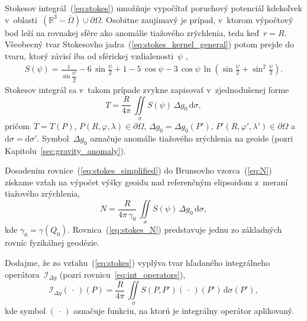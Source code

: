 \documentclass[a4paper, 12pt]{book}
\newcommand{\diff}{\mathrm d}
\begin{document}
Stokesov integrál~(\ref{eq:stokes}) umožňuje vypočítať poruchový potenciál 
kdekoľvek v~oblasti~$\left( \mathbb{R}^3 - \overline\Omega\right) \cup 
\partial\Omega$.  Osobitne zaujímavý je prípad, v~ktorom výpočtový bod leží na 
rovnakej sfére ako anomálie tiažového zrýchlenia, teda keď~$r = R$.  Všeobecný 
tvar Stokesovho jadra~(\ref{eq:stokes_kernel_general}) potom prejde do tvaru, 
ktorý závisí iba od sférickej vzdialenosti~$\psi$ 
\parencite{MoritzPhysicalGeodesy},
%
\begin{equation}
\label{eq:stokes_kernel}
\begin{split}
S(\psi) = \frac{1}{\sin\dfrac{\psi}{2}} - 6 \, \sin\frac{\psi}{2} + 1 - 5 \, 
\cos\psi - 3 \, \cos\psi \, \ln\left( \sin\frac{\psi}{2} + \sin^2\frac{\psi}{2} 
\right){.}
\end{split}
\end{equation}
%
Stokesov integrál sa v~takom prípade zvykne zapisovať v~zjednodušenej forme
%
\begin{equation}
\label{eq:stokes_simplified}
T = \frac{R}{4\pi} \, \iint\limits_{\sigma} S(\psi) \, \Delta g_0 \, \diff 
\sigma{,}
\end{equation}
%
pričom~$T = T(P)$, $P(R, \varphi, \lambda) \in \partial\Omega$, $\Delta g_0 
= \Delta g_0(P')$, $P'(R, \varphi', \lambda') \in \partial\Omega$ 
a~$\diff\sigma = \diff\sigma'$.  Symbol~$\Delta g_0$ označuje anomálie 
tiažového zrýchlenia na geoide (pozri Kapitolu~\ref{sec:gravity_anomaly}).

Dosadením rovnice~(\ref{eq:stokes_simplified}) do Brunsovho vzorca~(\ref{eq:N}) 
získame vzťah na výpočet výšky geoidu nad referenčným elipsoidom z~meraní 
tiažového zrýchlenia,
%
\begin{equation}
\label{eq:stokes_N}
N = \frac{R}{4\pi \, \gamma_0} \, \iint\limits_{\sigma} S(\psi) \, \Delta g_0 
\, \diff \sigma{,}
\end{equation}
%
kde $\gamma_0 = \gamma(Q_0)$.  Rovnica~(\ref{eq:stokes_N}) predstavuje jednu zo 
základných rovníc fyzikálnej geodézie.

Dodajme, že zo vzťahu~(\ref{eq:stokes}) vyplýva tvar hľadaného integrálneho 
operátora~$\mathcal{I}_{\Delta g}$ (pozri rovnicu~\ref{eq:int_operators}),
%
\begin{equation}
\label{eq:iDg}
\mathcal{I}_{\Delta g}( \, \cdot \, )(P) = \frac{R}{4\pi} \, 
\iint\limits_\sigma S(P, P') ( \, \cdot \, )(P') \, \diff\sigma(P'){,}
\end{equation}
%
kde symbol $(\, \cdot \,)$ označuje funkciu, na ktorú je integrálny operátor 
aplikovaný.
\end{document}

